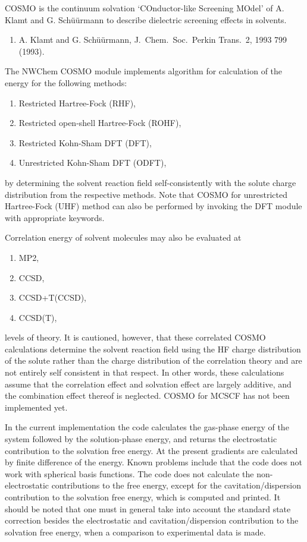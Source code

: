 %
%
\label{sec:cosmo}

COSMO is the continuum solvation `COnductor-like Screening MOdel'
of A. Klamt and G. Sch\"{u}\"{u}rmann to describe dielectric screening
effects in solvents.

\begin{enumerate}
\item A. Klamt and G. Sch\"{u}\"{u}rmann, J.~Chem.~Soc.~Perkin Trans.~2, 1993
799 (1993).
\end{enumerate}

The NWChem COSMO module implements algorithm for calculation of the
energy for the following methods:
\begin{enumerate}
\item Restricted Hartree-Fock (RHF),
\item Restricted open-shell Hartree-Fock (ROHF),
\item Restricted Kohn-Sham DFT (DFT),
\item Unrestricted Kohn-Sham DFT (ODFT),
\end{enumerate}
by determining the solvent reaction field self-consistently
with the solute charge distribution from the respective methods.
Note that COSMO for unrestricted Hartree-Fock (UHF) method
can also be performed by invoking the DFT module with appropriate
keywords.

Correlation energy of solvent molecules may also be evaluated at 
\begin{enumerate}
\item MP2,
\item CCSD,
\item CCSD+T(CCSD),
\item CCSD(T),
\end{enumerate}
levels of theory.  It is cautioned,
however, that these correlated COSMO calculations determine
the solvent reaction field using the HF charge distribution of
the solute rather than the charge distribution of the correlation
theory and are not entirely self consistent in that respect.  
In other words, these calculations assume that the correlation
effect and solvation effect are largely additive, and the combination
effect thereof is neglected. 
COSMO for MCSCF has not been implemented yet. 

In the current implementation the code
calculates the gas-phase energy of the system followed by the
solution-phase energy, and returns the electrostatic contribution
to the solvation free energy. 
At the present gradients are calculated by finite
difference of the energy.  Known problems include that the code does not 
work with spherical basis functions.
The code does not calculate the
non-electrostatic contributions to the free energy, except for
the cavitation/dispersion contribution to the solvation free energy,
which is computed and printed.
It should be noted that one must in general take into account 
the standard state correction besides the electrostatic
and cavitation/dispersion contribution to the solvation free energy,
when a comparison to experimental data is made.

